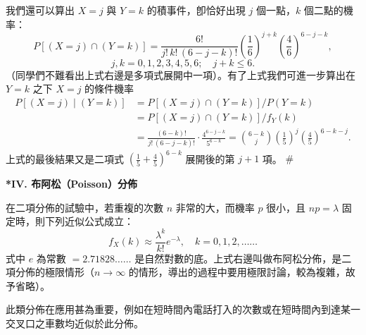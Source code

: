 \begin{example}
我們還可以算出 $X = j$ 與 $Y = k$ 的積事件，卽恰好出現 $j$ 個一點，$k$ 個二點的機率：
\[
P[(X = j) \cap (Y = k)] = \frac{6!}{j!\, k!\, (6 - j - k)!} \left(\frac{1}{6}\right)^{j+k} \left(\frac{4}{6}\right)^{6-j-k},
\]
\[
j, k = 0, 1, 2, 3, 4, 5, 6; \quad j + k \le 6.
\]
（同學們不難看出上式右邊是多項式展開中一項）。有了上式我們可進一步算出在 $Y = k$ 之下 $X = j$ 的條件機率
\begin{align*}
P[(X = j) \mid (Y = k)] &= P[(X = j) \cap (Y = k)] / P(Y = k) \\
&= P[(X = j) \cap (Y = k)] / f_Y(k) \\
&= \frac{(6 - k)!}{j!\, (6 - j - k)!} \cdot \frac{4^{6-j-k}}{5^{6-k}} = \binom{6 - k}{j} \left(\frac{1}{5}\right)^j \left(\frac{4}{5}\right)^{6-k-j}.
\end{align*}
上式的最後結果又是二項式 $\left(\frac{1}{5} + \frac{4}{5}\right)^{6-k}$ 展開後的第 $j+1$ 項。 \hfill $\#$
\end{example}

\medskip
\noindent\textbf{*IV. 布阿松（Poisson）分佈}

在二項分佈的試驗中，若重複的次數 $n$ 非常的大，而機率 $p$ 很小，且 $np = \lambda$ 固定時，則下列近似公式成立：
\begin{equation}
f_X(k) \approx \frac{\lambda^k}{k!} e^{-\lambda}, \quad k = 0, 1, 2, \dots\dots \label{eq:b5-ch5-3}
\end{equation}
式中 $e$ 為常數 $= 2.71828\dots\dots$ 是自然對數的底。上式右邊叫做布阿松分佈，是二項分佈的極限情形（$n \to \infty$ 的情形，導出的過程中要用極限討論，較為複雜，故予省略）。

此類分佈在應用甚為重要，例如在短時間內電話打入的次數或在短時間內到達某一交叉口之車數均近似於此分佈。


